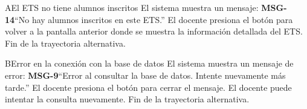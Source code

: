 \begin{UCtrayectoriaA}{A}{El ETS no tiene alumnos inscritos}
	\UCpaso El sistema muestra un mensaje: {\bf MSG-14}{``No hay alumnos inscritos en este ETS.''}
	\UCpaso[\UCactor] El docente presiona el botón  para volver a la pantalla anterior donde se muestra la información detallada del ETS.
	\UCpaso Fin de la trayectoria alternativa.
\end{UCtrayectoriaA}
\begin{UCtrayectoriaA}{B}{Error en la conexión con la base de datos}
	\UCpaso El sistema muestra un mensaje de error: {\bf MSG-9}{``Error al consultar la base de datos. Intente nuevamente más tarde.''}
	\UCpaso[\UCactor] El docente presiona el botón  para cerrar el mensaje.
	\UCpaso[\UCactor] El docente puede intentar la consulta nuevamente.
	\UCpaso Fin de la trayectoria alternativa.
\end{UCtrayectoriaA}
